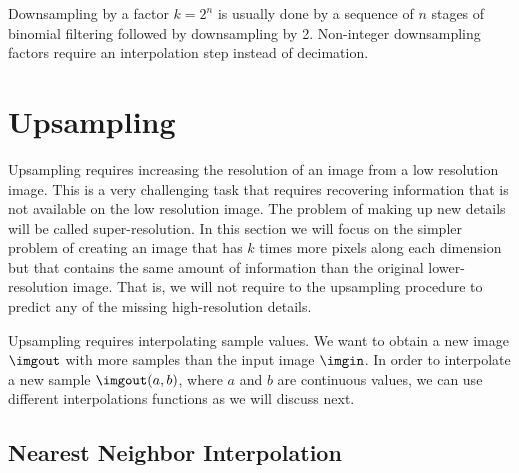 Downsampling by a factor $k=2^n$ is usually done by a sequence of $n$ stages of binomial filtering followed by downsampling by 2. Non-integer downsampling factors require an interpolation step instead of decimation.

\section{Upsampling}
\label{sec:upsampling}


Upsampling requires increasing the resolution of an image from a low resolution image. This is a very challenging task that requires recovering information that is not available on the low resolution image. The problem of making up new details will be called super-resolution.  In this section we will focus on the simpler problem of creating an image that has $k$ times more pixels along each dimension but that contains the same amount of information than the original lower-resolution image. That is, we will not require to the upsampling procedure to predict any of the missing high-resolution details.  

Upsampling requires interpolating sample values. We want to obtain a new image $\imgout$ with more samples than the input image $\imgin$. In order to interpolate a new sample $\imgout(a,b)$, where $a$ and $b$ are continuous values, we can use different interpolations functions as we will discuss next.

\subsection{Nearest Neighbor Interpolation}
\label{sec:interpolation}


